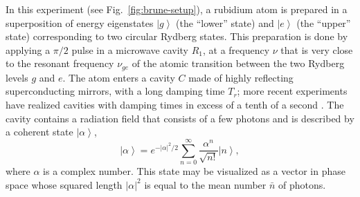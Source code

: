 \documentclass[3p,sort&compress]{elsarticle}
\newcommand{\ket}[1]{\left\vert{#1}\right\rangle}
\providecommand{\abs}[1]{\left\lvert#1\right\rvert}
\newcommand{\E}{\ensuremath{e}}
\begin{document}
In this experiment (see Fig.~\ref{fig:brune-setup}), a rubidium atom is prepared in a superposition of energy eigenstates $\ket{g}$ (the ``lower'' state) and $\ket{e}$ (the ``upper'' state) corresponding to two circular Rydberg states. This preparation is done by applying a $\pi/2$ pulse in a microwave   cavity $R_1$, at a frequency $\nu$ that is very close to the resonant frequency $\nu_{ge}$ of the atomic transition between the two Rydberg levels $g$ and $e$. The atom enters a cavity $C$ made of highly reflecting superconducting mirrors, with a long damping time $T_r$; more recent experiments have realized cavities with damping times in excess of a tenth of a second \cite{Kuhr:2007:aa,Deleglise:2008:oo}. The cavity contains a radiation field that consists of a few photons and is described by a coherent state $\ket{\alpha}$, 
%
\begin{equation}
\ket{\alpha} = \E^{- \abs{\alpha}^2 /2}\sum_{n=0}^\infty \frac{\alpha^n}{\sqrt{n!}}\ket{n},
\end{equation}
%
where $\alpha$ is a complex number. This state may be visualized as a vector in phase space whose squared length $\abs{\alpha}^2$ is equal to the  mean number $\bar{n}$ of photons. 
\end{document}
